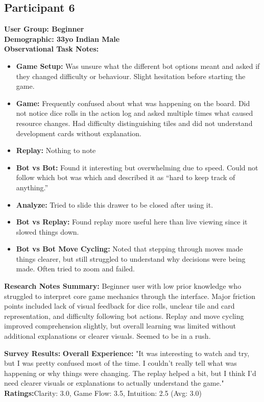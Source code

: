 \documentclass[12pt]{article}
\begin{document}
\subsection{Participant 6}
\textbf {User Group: Beginner} \\
\textbf {Demographic: 33yo Indian Male} \\
\textbf{Observational Task Notes:}
\begin{itemize}
    \item \textbf{Game Setup:} Was unsure what the different bot options meant and asked if they changed difficulty or behaviour. Slight hesitation before starting the game.
    \item \textbf{Game:} Frequently confused about what was happening on the board. Did not notice dice rolls in the action log and asked multiple times what caused resource changes. Had difficulty distinguishing tiles and did not understand development cards without explanation.
    \item \textbf{Replay:} Nothing to note
    \item \textbf{Bot vs Bot:} Found it interesting but overwhelming due to speed. Could not follow which bot was which and described it as “hard to keep track of anything.”
    \item \textbf{Analyze:} Tried to slide this drawer to be closed after using it.
    \item \textbf{Bot vs Replay:} Found replay more useful here than live viewing since it slowed things down.
    \item \textbf{Bot vs Bot Move Cycling:} Noted that stepping through moves made things clearer, but still struggled to understand why decisions were being made. Often tried to zoom and failed.
\end{itemize}
\textbf{Research Notes Summary:} Beginner user with low prior knowledge who struggled to interpret core game mechanics through the interface. Major friction points included lack of visual feedback for dice rolls, unclear tile and card representation, and difficulty following bot actions. Replay and move cycling improved comprehension slightly, but overall learning was limited without additional explanations or clearer visuals. Seemed to be in a rush.

\textbf{Survey Results:}
\subitem \textbf{Overall Experience:} "It was interesting to watch and try, but I was pretty confused most of the time. I couldn’t really tell what was happening or why things were changing. The replay helped a bit, but I think I’d need clearer visuals or explanations to actually understand the game."
\subitem \textbf{Ratings:}Clarity: 3.0, Game Flow: 3.5, Intuition: 2.5 (Avg: 3.0)
\end{document}
